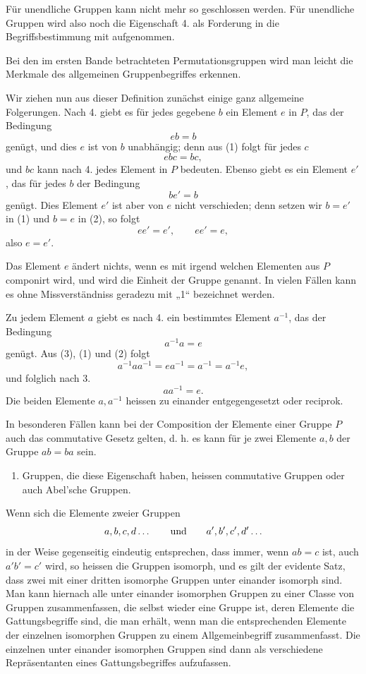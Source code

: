 \documentclass[11pt]{article}
\begin{document}
Für unendliche Gruppen kann nicht mehr so geschlossen werden. Für unendliche Gruppen wird also noch die Eigenschaft 4. als Forderung in die Begriffsbestimmung mit aufgenommen.

Bei den im ersten Bande betrachteten Permutationsgruppen wird man leicht die Merkmale des allgemeinen Gruppenbegriffes erkennen.

Wir ziehen nun aus dieser Definition zunächst einige ganz allgemeine Folgerungen. Nach 4. giebt es für jedes gegebene $b$ ein Element $e$ in $P$, das der Bedingung
\begin{equation}
eb=b
\tag{1}
\end{equation}
genügt, und dies $e$ ist von $b$ unabhängig; denn aus (1) folgt für jedes $c$
\[
ebc=bc,
\]
und $bc$ kann nach 4. jedes Element in $P$ bedeuten. Ebenso giebt es ein Element $e'$, das für jedes $b$ der Bedingung
\begin{equation}
be'=b
\tag{2}
\end{equation}
genügt. Dies Element $e'$ ist aber von $e$ nicht verschieden; denn setzen wir $b=e'$ in (1) und $b=e$ in (2), so folgt
\[
ee'=e',\qquad ee'=e,
\]
also $e=e'$.

Das Element $e$ ändert nichts, wenn es mit irgend welchen Elementen aus $P$ componirt wird, und wird die Einheit der Gruppe genannt. In vielen Fällen kann es ohne Missverständniss geradezu mit „1“ bezeichnet werden.

Zu jedem Element $a$ giebt es nach 4. ein bestimmtes Element $a^{-1}$, das der Bedingung
\begin{equation}
a^{-1}a=e
\tag{3}
\end{equation}
genügt. Aus (3), (1) und (2) folgt
\[
a^{-1}aa^{-1}=ea^{-1}=a^{-1}=a^{-1}e,
\]
und folglich nach 3.
\begin{equation}
aa^{-1}=e.
\tag{4}
\end{equation}
Die beiden Elemente $a,a^{-1}$ heissen zu einander entgegengesetzt oder reciprok.

In besonderen Fällen kann bei der Composition der Elemente einer Gruppe $P$ auch das commutative Gesetz gelten, d. h. es kann für je zwei Elemente $a,b$ der Gruppe $ab=ba$ sein.

\begin{enumerate}[resume,label=\arabic*.]
\item Gruppen, die diese Eigenschaft haben, heissen commutative Gruppen oder auch Abel'sche Gruppen.
\end{enumerate}

Wenn sich die Elemente zweier Gruppen
\[
a,b,c,d\ldots \qquad\hbox{und}\qquad a',b',c',d'\ldots
\]
in der Weise gegenseitig eindeutig entsprechen, dass immer, wenn $ab=c$ ist, auch $a'b'=c'$ wird, so heissen die Gruppen isomorph, und es gilt der evidente Satz, dass zwei mit einer dritten isomorphe Gruppen unter einander isomorph sind. Man kann hiernach alle unter einander isomorphen Gruppen zu einer Classe von Gruppen zusammenfassen, die selbst wieder eine Gruppe ist, deren Elemente die Gattungsbegriffe sind, die man erhält, wenn man die entsprechenden Elemente der einzelnen isomorphen Gruppen zu einem Allgemeinbegriff zusammenfasst. Die einzelnen unter einander isomorphen Gruppen sind dann als verschiedene Repräsentanten eines Gattungsbegriffes aufzufassen.
\end{document}
